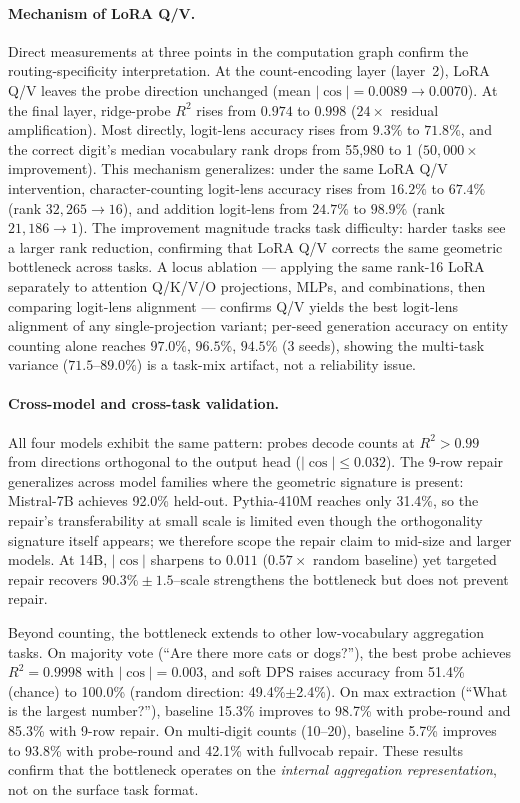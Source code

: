 \documentclass{article}
\begin{document}
\paragraph{Mechanism of LoRA Q/V.}
Direct measurements at three points in the computation graph confirm the
routing-specificity interpretation. At the count-encoding layer (layer~2),
LoRA Q/V leaves the probe direction unchanged (mean $|\cos| = 0.0089 \to
0.0070$). At the final layer, ridge-probe $R^2$ rises from $0.974$ to $0.998$
($24\times$ residual amplification). Most directly, logit-lens accuracy rises
from $9.3\%$ to $71.8\%$, and the correct digit's median vocabulary rank drops
from 55,980 to 1 ($50{,}000\times$ improvement). This mechanism generalizes:
under the same LoRA Q/V intervention, character-counting logit-lens accuracy
rises from $16.2\%$ to $67.4\%$ (rank $32{,}265 \to 16$), and addition
logit-lens from $24.7\%$ to $98.9\%$ (rank $21{,}186 \to 1$). The improvement
magnitude tracks task difficulty: harder tasks see a larger rank reduction,
confirming that LoRA Q/V corrects the same geometric bottleneck across tasks.
A locus ablation --- applying the same rank-16 LoRA separately to attention
Q/K/V/O projections, MLPs, and combinations, then comparing logit-lens
alignment --- confirms Q/V yields the best logit-lens alignment of any
single-projection variant; per-seed generation accuracy on entity counting
alone reaches $97.0\%$, $96.5\%$, $94.5\%$ (3 seeds), showing the multi-task
variance ($71.5$--$89.0\%$) is a task-mix artifact, not a reliability issue.

\paragraph{Cross-model and cross-task validation.}
All four models exhibit the same pattern: probes decode counts at $R^2 > 0.99$
from directions orthogonal to the output head ($|\cos| \leq 0.032$). The 9-row
repair generalizes across model families where the geometric signature is
present: Mistral-7B achieves 92.0\% held-out. Pythia-410M reaches only
31.4\%, so the repair's transferability at small scale is limited even though
the orthogonality signature itself appears; we therefore scope the repair
claim to mid-size and larger models. At 14B, $|\cos|$ sharpens to $0.011$
($0.57\times$ random
baseline) yet targeted repair recovers $90.3\% \pm 1.5$\---scale strengthens
the bottleneck but does not prevent repair.

Beyond counting, the bottleneck extends to other low-vocabulary aggregation
tasks. On majority vote (``Are there more cats or dogs?''), the best probe
achieves $R^2 = 0.9998$ with $|\cos| = 0.003$, and soft DPS raises accuracy
from 51.4\% (chance) to 100.0\% (random direction: 49.4\%$\pm$2.4\%). On max
extraction (``What is the largest number?''), baseline 15.3\% improves to
98.7\% with probe-round and 85.3\% with 9-row repair. On multi-digit counts
(10--20), baseline 5.7\% improves to 93.8\% with probe-round and 42.1\% with
fullvocab repair. These results confirm that the bottleneck operates on the
\emph{internal aggregation representation}, not on the surface task format.
\end{document}
